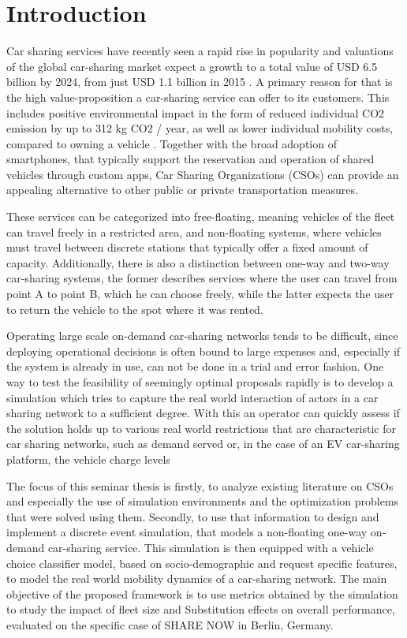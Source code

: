 \clearpage
\section{Introduction}
\label{sec:Intro}

Car sharing services have recently seen a rapid rise in popularity 
and valuations of the global car-sharing market expect a growth to
a total value of USD 6.5 billion by 2024, from just USD 1.1 billion in 2015 . 
A primary reason for that is the high value-proposition a car-sharing service
can offer to its customers. This includes positive environmental impact in the form of
reduced individual CO2 emission by up to 312 kg CO2 / year, as well as
lower individual mobility costs, compared to owning a vehicle . 
Together with the
broad adoption of smartphones, that typically
support the reservation and operation of shared vehicles through custom apps, Car Sharing Organizations (CSOs)
can provide an appealing alternative to other public or private transportation measures.

These services can be categorized into free-floating, meaning vehicles of the fleet
can travel freely in a restricted area, and non-floating systems, where vehicles must travel
between discrete stations that typically offer a fixed amount of capacity. Additionally,
there is also a distinction between one-way and two-way car-sharing systems, the former
describes services where the user can travel from point A to point B, which he can choose
freely, while the latter expects the user to return the vehicle to the spot where it was
rented.

Operating large scale on-demand car-sharing networks tends to be difficult, since
deploying operational decisions is often bound to large expenses and, especially if the
system is already in use, can not be done in a trial and error fashion. One way to test the feasibility of
seemingly optimal proposals rapidly is to develop a simulation which tries to capture the real world
interaction of actors in a car sharing network to a sufficient degree. With this an operator can 
quickly assess if the solution holds up to various real world restrictions that are characteristic
for car sharing networks, such as demand served or, in the case of an EV car-sharing platform, the vehicle
charge levels 

The focus of this seminar thesis is firstly, to analyze existing literature on CSOs and especially
the use of simulation environments and the optimization problems that were solved using them.
Secondly, to use that information to design
and implement a discrete event simulation, that models a non-floating one-way on-demand
car-sharing service. This simulation is then equipped with a vehicle choice
classifier model, based on socio-demographic and request specific features,
to model the real world mobility dynamics of a car-sharing network.
The main objective of the proposed framework is to use metrics obtained by the simulation
to study the impact of fleet size and Substitution effects on overall performance,
evaluated on the specific case of SHARE NOW in Berlin, Germany.
